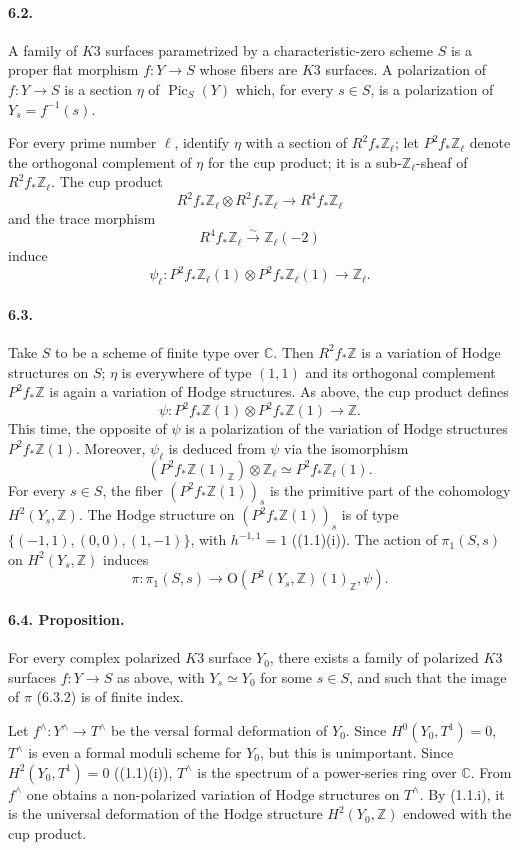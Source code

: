 \documentclass[10pt]{article}
\newcommand{\C}{\mathbb{C}}
\newcommand{\Z}{\mathbb{Z}}
\newcommand{\Pic}{\operatorname{Pic}}
\newcommand{\iso}{\xrightarrow{\sim}}
\begin{document}
\paragraph{6.2.} A family of $K3$ surfaces parametrized by a characteristic-zero scheme $S$ is a proper flat morphism $f:Y\to S$ whose fibers are $K3$ surfaces. A polarization of $f:Y\to S$ is a section $\eta$ of $\Pic_S(Y)$ which, for every $s\in S$, is a polarization of $Y_s=f^{-1}(s)$.

For every prime number $\ell$, identify $\eta$ with a section of $R^2f_*\Z_\ell$; let $P^2f_*\Z_\ell$ denote the orthogonal complement of $\eta$ for the cup product; it is a sub-$\Z_\ell$-sheaf of $R^2f_*\Z_\ell$. The cup product
\[
R^2f_*\Z_\ell\otimes R^2f_*\Z_\ell\longrightarrow R^4f_*\Z_\ell
\]
and the trace morphism
\[
R^4f_*\Z_\ell\iso \Z_\ell(-2)
\]
induce
\[
\tag{6.2.1}
\psi_\ell:P^2f_*\Z_\ell(1)\otimes P^2f_*\Z_\ell(1)\longrightarrow\Z_\ell.
\]

\paragraph{6.3.} Take $S$ to be a scheme of finite type over $\C$. Then $R^2f_*\Z$ is a variation of Hodge structures on $S$; $\eta$ is everywhere of type $(1,1)$ and its orthogonal complement $P^2f_*\Z$ is again a variation of Hodge structures. As above, the cup product defines
\[
\tag{6.3.1}
\psi:P^2f_*\Z(1)\otimes P^2f_*\Z(1)\longrightarrow\Z.
\]
This time, the opposite of $\psi$ is a polarization of the variation of Hodge structures $P^2f_*\Z(1)$. Moreover, $\psi_\ell$ is deduced from $\psi$ via the isomorphism
\[
(P^2f_*\Z(1)_\Z)\otimes\Z_\ell\simeq P^2f_*\Z_\ell(1).
\]
For every $s\in S$, the fiber $(P^2f_*\Z(1))_s$ is the primitive part of the cohomology $H^2(Y_s,\Z)$. The Hodge structure on $(P^2f_*\Z(1))_s$ is of type $\{(-1,1),(0,0),(1,-1)\}$, with $h^{-1,1}=1$ ((1.1)(i)). The action of $\pi_1(S,s)$ on $H^2(Y_s,\Z)$ induces
\[
\tag{6.3.2}
\pi:\pi_1(S,s)\longrightarrow
\mathrm O(P^2(Y_s,\Z)(1)_\Z,\psi).
\]

\paragraph{6.4. Proposition.} For every complex polarized $K3$ surface $Y_0$, there exists a family of polarized $K3$ surfaces $f:Y\to S$ as above, with $Y_s\simeq Y_0$ for some $s\in S$, and such that the image of $\pi$ (6.3.2) is of finite index.

Let $f^\wedge:Y^\wedge\to T^\wedge$ be the versal formal deformation of $Y_0$. Since $H^0(Y_0,T^1)=0$, $T^\wedge$ is even a formal moduli scheme for $Y_0$, but this is unimportant. Since $H^2(Y_0,T^1)=0$ ((1.1)(i)), $T^\wedge$ is the spectrum of a power-series ring over $\C$. From $f^\wedge$ one obtains a non-polarized variation of Hodge structures on $T^\wedge$. By (1.1.i), it is the universal deformation of the Hodge structure $H^2(Y_0,\Z)$ endowed with the cup product.
\end{document}
